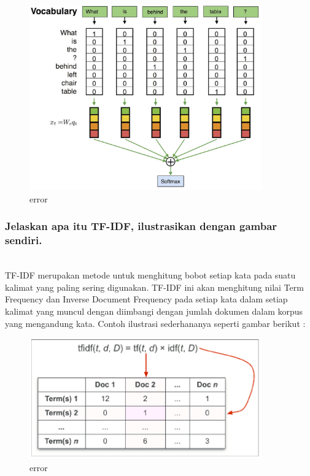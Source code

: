 	\begin{figure}[H]
		\begin{center}
		 \includegraphics[width=10cm]{figures/1174076/figures4/4.png}
		 \caption{error}	
		\end{center}
	\end{figure}

	
	\subsubsection{Jelaskan apa itu TF-IDF, ilustrasikan dengan gambar sendiri.}\hfill\\
TF-IDF merupakan metode untuk menghitung bobot setiap kata pada suatu kalimat yang paling sering digunakan. TF-IDF ini akan menghitung nilai Term Frequency dan Inverse Document Frequency pada setiap kata dalam setiap kalimat yang muncul dengan diimbangi dengan jumlah dokumen dalam korpus yang mengandung kata. Contoh ilustrasi sederhananya seperti gambar berikut : 

	\begin{figure}[H]
		\begin{center}
		 \includegraphics[width=10cm]{figures/1174076/figures4/5.png}
		 \caption{error}	
		\end{center}
	\end{figure}
	

